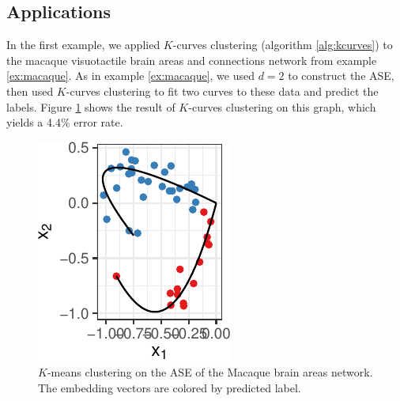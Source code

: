 \documentclass[
  12pt,
]{article}
\theoremstyle{definition}
\theoremstyle{definition}
\theoremstyle{definition}
\theoremstyle{definition}
\theoremstyle{remark}
\begin{document}
\hypertarget{applications-1}{%
\subsection{Applications}\label{applications-1}}

In the first example, we applied \(K\)-curves clustering (algorithm \ref{alg:kcurves}) to the macaque visuotactile brain areas and connections network from example \ref{ex:macaque}.
As in example \ref{ex:macaque}, we used \(d = 2\) to construct the ASE, then used \(K\)-curves clustering to fit two curves to these data and predict the labels.
Figure \ref{fig:macaque-fitted} shows the result of \(K\)-curves clustering on this graph,
which yields a 4.4\% error rate.

\begin{figure}[H]

{\centering \includegraphics{draft_files/figure-latex/macaque-fitted-1} 

}

\caption{$K$-means clustering on the ASE of the Macaque brain areas network. The embedding vectors are colored by predicted label.}\label{fig:macaque-fitted}
\end{figure}
\end{document}
